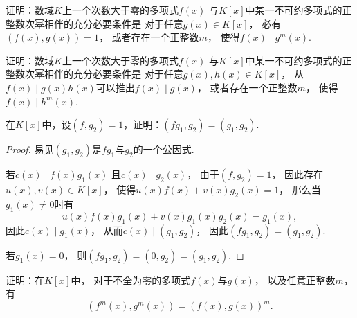 \begin{example}
证明：数域\(K\)上一个次数大于零的多项式\(f(x)\)
与\(K[x]\)中某一不可约多项式的正整数次幂相伴的充分必要条件是
对于任意\(g(x) \in K[x]\)，
必有\((f(x),g(x))=1\)，
或者存在一个正整数\(m\)，
使得\(f(x) \mid g^m(x)\).
\end{example}

\begin{example}
证明：数域\(K\)上一个次数大于零的多项式\(f(x)\)
与\(K[x]\)中某一不可约多项式的正整数次幂相伴的充分必要条件是
对于任意\(g(x),h(x) \in K[x]\)，
从\(f(x) \mid g(x) h(x)\)可以推出\(f(x) \mid g(x)\)，
或者存在一个正整数\(m\)，
使得\(f(x) \mid h^m(x)\).
\end{example}

\begin{example}
在\(K[x]\)中，设\((f,g_2)=1\)，证明：\((fg_1,g_2)=(g_1,g_2)\).
\begin{proof}
易见\((g_1,g_2)\)是\(fg_1\)与\(g_2\)的一个公因式.

若\(c(x) \mid f(x) g_1(x)\)
且\(c(x) \mid g_2(x)\)，
由于\((f,g_2)=1\)，
因此存在\(u(x),v(x) \in K[x]\)，
使得\(u(x) f(x) + v(x) g_2(x) = 1\)，
那么当\(g_1(x)\neq0\)时有\begin{equation*}
	u(x) f(x) g_1(x) + v(x) g_1(x) g_2(x) = g_1(x),
\end{equation*}
因此\(c(x) \mid g_1(x)\)，
从而\(c(x) \mid (g_1,g_2)\)，
因此\((fg_1,g_2)=(g_1,g_2)\).

若\(g_1(x)=0\)，
则\((fg_1,g_2)=(0,g_2)=(g_1,g_2)\).
\end{proof}
\end{example}

\begin{example}
证明：在\(K[x]\)中，
对于不全为零的多项式\(f(x)\)与\(g(x)\)，
以及任意正整数\(m\)，
有\begin{equation*}
	(f^m(x),g^m(x))=(f(x),g(x))^m.
\end{equation*}
\end{example}
